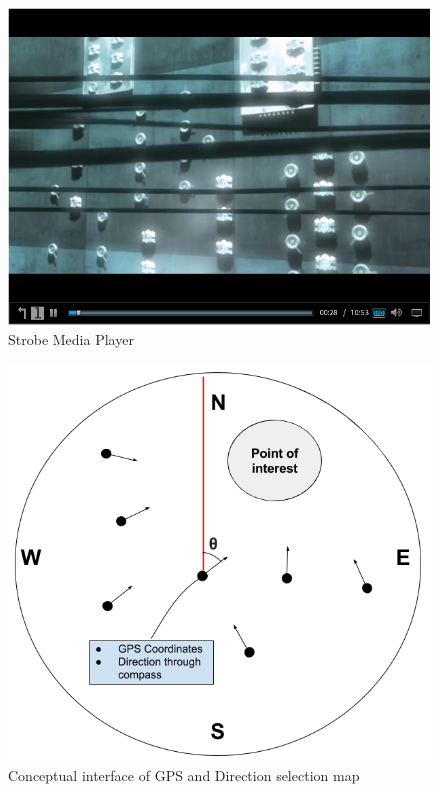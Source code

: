 \begin{figure}[ht!]
\begin{center}
	\includegraphics[scale=0.7]{Media_player.png}
	\caption{Strobe Media Player}
	\label{fig:mediaplayer}
\end{center}
\end{figure}

\begin{figure}[ht!]
\begin{center}
	\includegraphics[scale=0.6]{teomet.png}
	\caption{Conceptual interface of GPS and Direction selection map}
	\label{fig:gpsinterface}
\end{center}
\end{figure}


